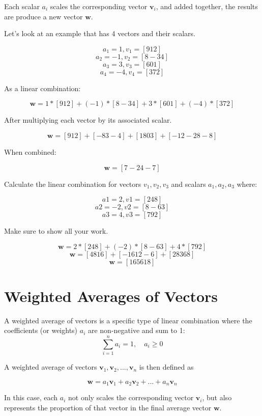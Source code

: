 Each scalar $a_i$ scales the corresponding vector $\mathbf{v}_i$, and
added together, the results are produce a new vector $\mathbf{w}$.

Let's look at an example that has 4 vectors and their scalars. 

$$a_1 = 1, v_1 = [9 1 2]$$
$$a_2 = -1, v_2 = [8 -3 4]$$
$$a_3 = 3, v_3 = [6 0 1]$$
$$a_4 = -4, v_4 = [3 7 2]$$

As a linear combination:

$$\mathbf{w} = 1*[9 1 2] + (-1)*[8 -3 4]+ 3*[6 0 1] + (-4)*[3 7 2]$$

After multiplying each vector by its associated scalar.

$$\mathbf{w} = [9 1 2] + [-8 3 -4] + [18 0 3] + [-12 -28 -8]$$

When combined:

$$\mathbf{w} = [7 -24 -7]$$

\begin{Exercise}[title={Linear Combination}, label=linearCombo]
Calculate the linear combination 
for vectors $v_1, v_2, v_3$ and
scalars $a_1, a_2,a_3$ where:   

$$a1 = 2, v1 = [2 4 8]$$
$$a2 = -2,v2 = [8 -6 3]$$
$$a3 = 4,v3 = [7 9 2]$$

Make sure to show all your work. 
\end{Exercise}
\begin{Answer}[ref=linearCombo]
     \[
	\mathbf{w} = 2*[2 4 8] + (-2)*[8 -6 3] + 4*[7 9 2] 
	\]
  	\[
	\mathbf{w} = [4 8 16] + [-16 12 -6] + [28 36 8] 
	\]  
 	\[
	\mathbf{w} = [16 56 18]  
	\]   
\end{Answer}

\section{Weighted Averages of Vectors}
A weighted average of vectors is a specific type of linear combination
where the coefficients (or weights) $a_i$ are non-negative and sum to
1:
\[
\sum_{i=1}^{n} a_i = 1, \quad a_i \geq 0
\]

A weighted average of vectors $\mathbf{v}_1, \mathbf{v}_2, ...,
\mathbf{v}_n$ is then defined as

\[
\mathbf{w} = a_1\mathbf{v}_1 + a_2\mathbf{v}_2 + ... + a_n\mathbf{v}_n
\]

In this case, each $a_i$ not only scales the corresponding vector
$\mathbf{v}_i$, but also represents the proportion of that vector in
the final average vector $\mathbf{w}$.

